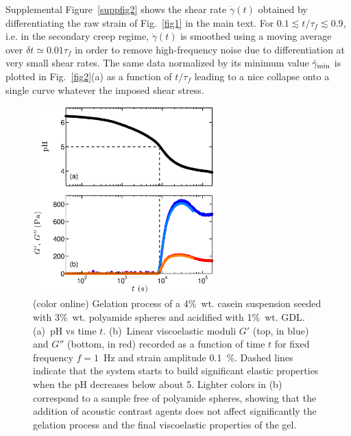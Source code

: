 \documentclass[twocolumn,superscriptaddress,showpacs,preprintnumbers,amsmath,amssymb,prl]{revtex4}
\newcommand\gp{\dot\gamma}
\begin{document}
Supplemental Figure~\ref{suppfig2} shows the shear rate $\gp(t)$ obtained by differentiating the raw strain of Fig.~\ref{fig1} in the main text. For $0.1\lesssim t/\tau_f\lesssim 0.9$, i.e. in the secondary creep regime, $\gp(t)$ is smoothed using a moving average over $\delta t\simeq 0.01\tau_f$ in order to remove high-frequency noise due to differentiation at very small shear rates. The same data normalized by its minimum value $\gp_{\rm min}$ is plotted in Fig.~\ref{fig2}(a) as a function of $t/\tau_f$ leading to a nice collapse onto a single curve whatever the imposed shear stress.

\begin{figure}[th]
\centering
\includegraphics[width=7cm,clip]{SuppFig1.eps}
\caption{(color online) Gelation process of a 4\%~wt. casein suspension seeded with 3\%~wt. polyamide spheres and acidified with 1\%~wt. GDL. (a)~pH vs time $t$. (b)~Linear viscoelastic moduli $G'$ (top, in blue) and $G''$ (bottom, in red) recorded as a function of time $t$ for fixed frequency $f=1$~Hz and strain amplitude 0.1~\%. Dashed lines indicate that the system starts to build significant elastic properties when the pH decreases below about 5. Lighter colors in (b) correspond to a sample free of polyamide spheres, showing that the addition of acoustic contrast agents does not affect significantly the gelation process and the final viscoelastic properties of the gel.
\label{suppfig1}}
\end{figure} 
\end{document}

